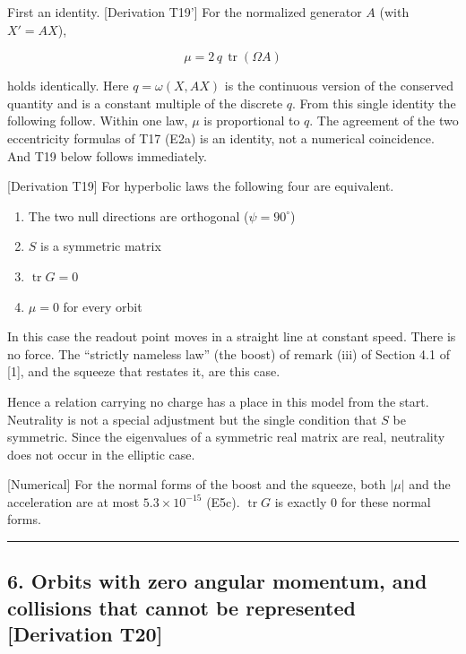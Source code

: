 \documentclass[
  a4paper,
]{article}
\providecommand{\tightlist}{%
  \setlength{\itemsep}{0pt}\setlength{\parskip}{0pt}}
\begin{document}
First an identity. {[}Derivation T19'{]} For the normalized generator
\(A\) (with \(X'=AX\)),

\[
\boxed{\;\mu=2\,q\,\operatorname{tr}(\Omega A)\;}
\]

holds identically. Here \(q=\omega(X,AX)\) is the continuous version of
the conserved quantity and is a constant multiple of the discrete \(q\).
From this single identity the following follow. Within one law, \(\mu\)
is proportional to \(q\). The agreement of the two eccentricity formulas
of T17 (E2a) is an identity, not a numerical coincidence. And T19 below
follows immediately.

{[}Derivation T19{]} For hyperbolic laws the following four are
equivalent.

\begin{enumerate}
\def\labelenumi{\arabic{enumi}.}
\tightlist
\item
  The two null directions are orthogonal (\(\psi=90^\circ\))
\item
  \(S\) is a symmetric matrix
\item
  \(\operatorname{tr}G=0\)
\item
  \(\mu=0\) for every orbit
\end{enumerate}

In this case the readout point moves in a straight line at constant
speed. There is no force. The ``strictly nameless law'' (the boost) of
remark (iii) of Section 4.1 of {[}1{]}, and the squeeze that restates
it, are this case.

Hence a relation carrying no charge has a place in this model from the
start. Neutrality is not a special adjustment but the single condition
that \(S\) be symmetric. Since the eigenvalues of a symmetric real
matrix are real, neutrality does not occur in the elliptic case.

{[}Numerical{]} For the normal forms of the boost and the squeeze, both
\(\lvert\mu\rvert\) and the acceleration are at most
\(5.3\times10^{-15}\) (E5c). \(\operatorname{tr}G\) is exactly 0 for
these normal forms.

\begin{center}\rule{0.5\linewidth}{0.5pt}\end{center}

\subsection{6. Orbits with zero angular momentum, and collisions that
cannot be represented {[}Derivation
T20{]}}\label{orbits-with-zero-angular-momentum-and-collisions-that-cannot-be-represented-derivation-t20}
\end{document}
